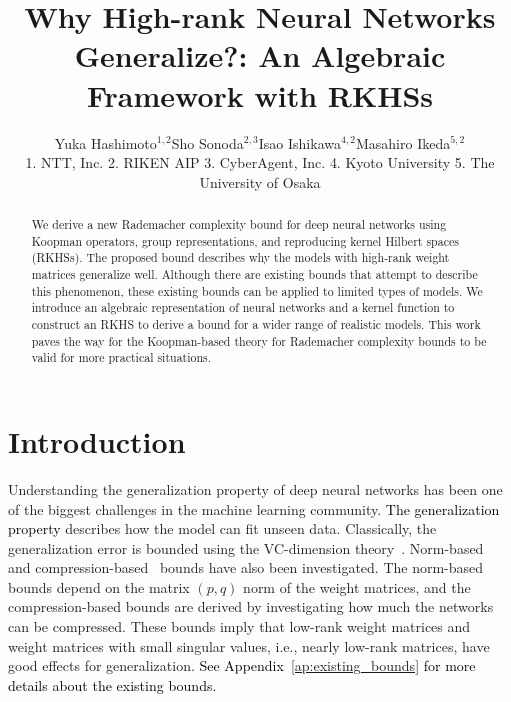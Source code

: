 \documentclass[twoside]{article}
\title{Why High-rank Neural Networks Generalize?: An Algebraic Framework with RKHSs}
\author{Yuka Hashimoto$^{1,2}$\quad Sho Sonoda$^{2,3}$\quad Isao Ishikawa$^{4,2}$\quad Masahiro Ikeda$^{5,2}$\medskip\\
{\normalsize 1. NTT, Inc.}
{\normalsize 2. RIKEN AIP}
{\normalsize 3. CyberAgent, Inc.}
{\normalsize 4. Kyoto University}
{\normalsize 5. The University of Osaka}}
\date{}
\def\red#1{\textcolor{black}{#1}}
\begin{document}
\maketitle

\begin{abstract}
We derive a new Rademacher complexity bound for deep neural networks using Koopman operators, group representations, and reproducing kernel Hilbert spaces (RKHSs).
The proposed bound describes why the models with high-rank weight matrices generalize well.
Although there are existing bounds that attempt to describe this phenomenon, these existing bounds can be applied to limited types of models.
We introduce an algebraic representation of neural networks and a kernel function to construct an RKHS to derive a bound
for a wider range of realistic models.
This work paves the way for the Koopman-based theory for Rademacher complexity bounds to be valid for more practical situations.
\end{abstract}

\section{Introduction}
Understanding the generalization property of deep neural networks has been one of the biggest challenges in the machine learning community. 
\red{The generalization property} describes how the model can fit unseen data.
Classically, the generalization error is bounded using the VC-dimension theory~\citep{harvey17,anthony09}.
Norm-based ~\citep{neyshabur15,bartlett17,golowich18,neyshabur18,wei19,li21,ju22,weinan22} and compression-based~\citep{arora18,Suzuki20} bounds have also been investigated.
The norm-based bounds depend on the matrix $(p, q)$ norm of the weight matrices, and the compression-based bounds are derived by investigating how much the networks can be compressed.
These bounds imply that low-rank weight matrices and weight matrices with small singular values, i.e., nearly low-rank matrices, have good effects for generalization.
\red{See Appendix~\ref{ap:existing_bounds} for more details about the existing bounds.}

\end{document}
